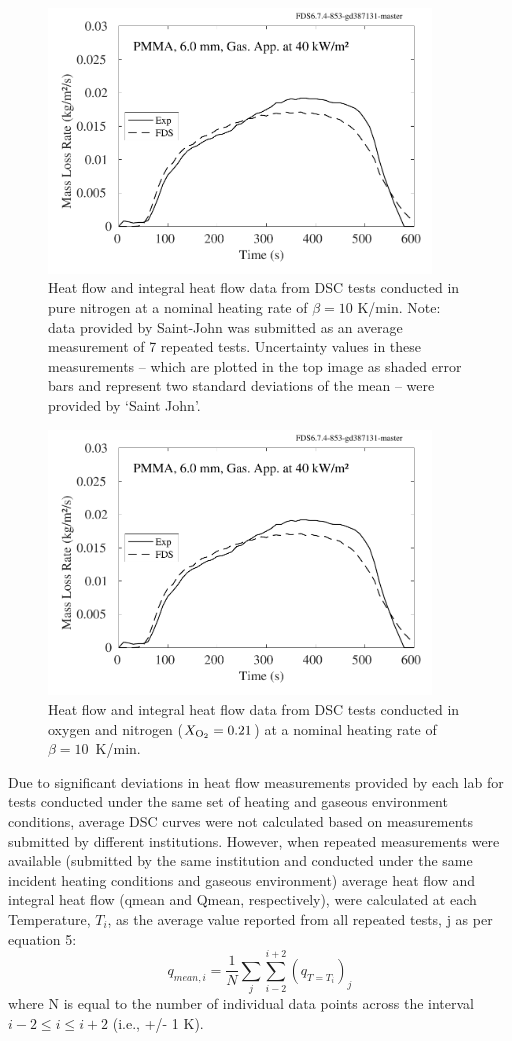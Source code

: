 \documentclass{book}
\begin{document}
\begin{figure}
  \centering
  \includegraphics[width=4in]{SCRIPT_FIGURES/PMMA_40}
  \caption{Heat flow and integral heat flow data from DSC tests conducted in pure nitrogen at a nominal heating rate of $\beta=10$ K/min. Note: data provided by Saint-John was submitted as an average measurement of 7 repeated tests. Uncertainty values in these measurements – which are plotted in the top image as shaded error bars and represent two standard deviations of the mean – were provided by ‘Saint John’.}
  \label{Fig_11}
\end{figure}

\begin{figure}
  \centering
  \includegraphics[width=4in]{SCRIPT_FIGURES/PMMA_40}
  \caption{Heat flow and integral heat flow data from DSC tests conducted in oxygen and nitrogen ($X_{\rm O_2}=0.21$) at a nominal heating rate of $\beta=10$~K/min.}
  \label{Fig_12}
\end{figure}

Due to significant deviations  in heat flow measurements provided by each lab for tests conducted under the same set of heating and gaseous environment conditions, average DSC curves were not calculated based on measurements submitted by different institutions. However, when repeated measurements were available (submitted by the same institution and conducted under the same incident heating conditions and gaseous environment) average heat flow and integral heat flow (qmean and Qmean, respectively), were calculated at each Temperature, $T_i$, as the average value reported from all repeated tests, j  as per equation 5:
\begin{equation}
   q_{mean,i}=\frac{1}{N}\sum_{j}\sum_{i-2}^{i+2}\left(q_{T=T_i}\right)_j
\end{equation}
where N is equal to the number of individual data points across the interval $i-2 \le i \le i+2$ (i.e., +/- 1 K).
\end{document}
